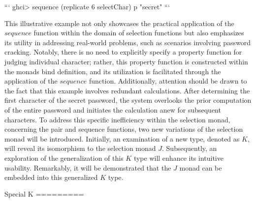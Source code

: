 ```
ghci> sequence (replicate 6 selectChar) p
"secret"
```

This illustrative example not only showcases the practical application of the $sequence$ 
function within the domain of selection functions but also emphasizes its utility in 
addressing real-world problems, such as scenarios involving password cracking. Notably, 
there is no need to explicitly specify a property function for judging individual 
character; rather, this property function is constructed within the monads bind 
definition, and its utilization is facilitated through the application of the $sequence$ 
function. Additionally, attention should be drawn to the fact that this example involves 
redundant calculations. After determining the first character of the secret password, the 
system overlooks the prior computation of the entire password and initiates the calculation 
anew for subsequent characters.
To address this specific inefficiency within the selection monad, concerning the pair and 
sequence functions, two new variations of the selection monad will be introduced. 
Initially, an examination of a new type, denoted as $K$, will reveal its isomorphism to 
the selection monad $J$. Subsequently, an exploration of the generalization of this $K$ 
type will enhance its intuitive usability. Remarkably, it will be demonstrated that the 
$J$ monad can be embedded into this generalized $K$ type.

Special K
=========

